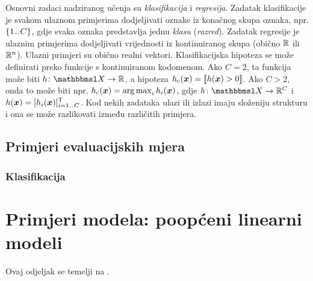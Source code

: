 \documentclass[utf8, diplomski, lmodern]{fer}
\begin{document}
Osnovni zadaci nadziranog učenja su \emph{klasifikacija} i \emph{regresija}. Zadatak klasifikacije je svakom ulaznom primjerima dodjeljivati oznake iz konačnog skupa oznaka, npr. $\cbr{1\bidot C}$, gdje svaka oznaka predstavlja jednu \emph{klasu} (\emph{razred}). Zadatak regresije je ulaznim primjerima dodjeljivati vrijednosti iz kontinuiranog skupa (obično $\mathbb{R}$ ili $\mathbb{R}^n$). Ulazni primjeri su obično realni vektori. Klasifikacijska hipoteza se može definirati preko funkcije s kontinuiranom kodomenom. Ako $C=2$, ta funkcija može biti $\funcdef{h}{\set X}{\R}$, a hipoteza $h_\text{c}(\vec x)=\enbbracket{h(\vec x)>0}$. Ako $C>2$, onda to može biti npr. $h_\text{c}(\vec x)=\argmax_i h_i(\vec x)$, gdje $\funcdef{h}{\set X}{\R^C}$ i $h(\vec x)=\sbr{h_i(\vec x)}_{i=1\bidot C}^\tp$. Kod nekih zadataka ulazi ili izlazi imaju složeniju strukturu i ona se može razlikovati između različitih primjera.

\subsection{Primjeri evaluacijskih mjera}


\subsubsection{Klasifikacija}


\section{Primjeri modela: poopćeni linearni modeli} \label{sec:poopceni-linearni-modeli}

Ovaj odjeljak se temelji na \citep{Snajder:2014:SU}.
\end{document}
